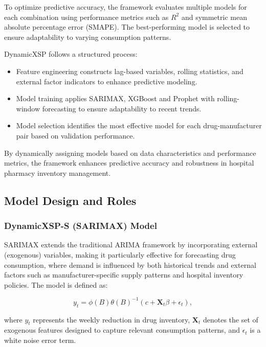 \documentclass[journal]{IEEEtran}
\begin{document}
To optimize predictive accuracy, the framework evaluates multiple models for each combination using performance metrics such as \( R^2 \) and symmetric mean absolute percentage error (SMAPE). The best-performing model is selected to ensure adaptability to varying consumption patterns.

DynamicXSP follows a structured process:

\begin{itemize}
    \item Feature engineering constructs lag-based variables, rolling statistics, and external factor indicators to enhance predictive modeling.
    \item Model training applies SARIMAX, XGBoost and Prophet with rolling-window forecasting to ensure adaptability to recent trends.
    \item Model selection identifies the most effective model for each drug-manufacturer pair based on validation performance.
\end{itemize}

By dynamically assigning models based on data characteristics and performance metrics, the framework enhances predictive accuracy and robustness in hospital pharmacy inventory management.

\subsection{Model Design and Roles}
\subsubsection{DynamicXSP-S (SARIMAX) Model}

SARIMAX extends the traditional ARIMA framework by incorporating external (exogenous) variables, making it particularly effective for forecasting drug consumption, where demand is influenced by both historical trends and external factors such as manufacturer-specific supply patterns and hospital inventory policies. The model is defined as:

\begin{equation}
y_{t} = \phi(B)\theta(B)^{-1} \left( c + \mathbf{X}_{t}\beta + \epsilon_{t} \right),
\end{equation}

where \(y_{t}\) represents the weekly reduction in drug inventory, \(\mathbf{X}_{t}\) denotes the set of exogenous features designed to capture relevant consumption patterns, and \(\epsilon_{t}\) is a white noise error term.
\end{document}
